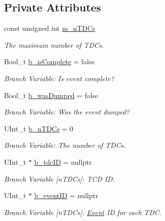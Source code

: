 \subsection*{Private Attributes}
\begin{DoxyCompactItemize}
\item 
const unsigned int \hyperlink{class_event_tree_manager_a87c672aa1531b362b15eddf11cab00c8}{m\+\_\+n\+T\+D\+Cs}
\begin{DoxyCompactList}\small\item\em The maximum number of T\+D\+Cs. \end{DoxyCompactList}\item 
Bool\+\_\+t \hyperlink{class_event_tree_manager_a6e9b9bd6363f95fce295b19cb544ea83}{b\+\_\+is\+Complete} = false
\begin{DoxyCompactList}\small\item\em Branch Variable\+: Is event complete? \end{DoxyCompactList}\item 
Bool\+\_\+t \hyperlink{class_event_tree_manager_ab99e54a6c2d4c59bb073038649b3ae4f}{b\+\_\+was\+Dumped} = false
\begin{DoxyCompactList}\small\item\em Branch Variable\+: Was the event dumped? \end{DoxyCompactList}\item 
U\+Int\+\_\+t \hyperlink{class_event_tree_manager_a8414d85d8ae7c9ea4ae3873c57121749}{b\+\_\+n\+T\+D\+Cs} = 0
\begin{DoxyCompactList}\small\item\em Branch Variable\+: The number of T\+D\+Cs. \end{DoxyCompactList}\item 
U\+Int\+\_\+t $\ast$ \hyperlink{class_event_tree_manager_a0e8cb571dd8ffe1295e9e31ce45c5d82}{b\+\_\+tdc\+ID} = nullptr
\begin{DoxyCompactList}\small\item\em Branch Variable \mbox{[}n\+T\+D\+Cs\mbox{]}\+: T\+CD ID. \end{DoxyCompactList}\item 
U\+Int\+\_\+t $\ast$ \hyperlink{class_event_tree_manager_a3dea1a727165f6864be347642fc0728f}{b\+\_\+event\+ID} = nullptr
\begin{DoxyCompactList}\small\item\em Branch Variable \mbox{[}n\+T\+D\+Cs\mbox{]}\+: \hyperlink{class_event}{Event} ID for each T\+DC. \end{DoxyCompactList}\item 

\end{DoxyCompactItemize}
